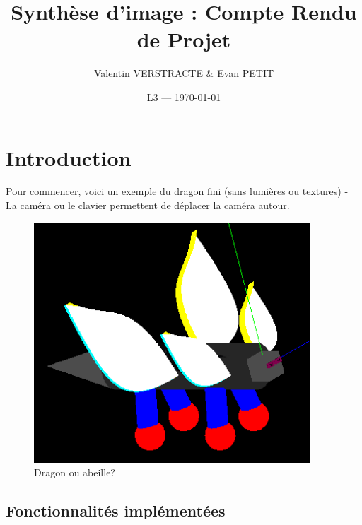 \documentclass{article}
\title{Synthèse d'image : Compte Rendu de Projet} %
\author{Valentin VERSTRACTE \& Evan PETIT}
\date{L3 --- \today} %
\begin{document}
\maketitle %

\bigskip
\bigskip
\renewcommand{\contentsname}{Table des matières}
\tableofcontents
\newpage


\section{Introduction} 

Pour commencer, voici un exemple du dragon fini (sans lumières ou textures) - La caméra ou le clavier permettent de déplacer la caméra autour.
\bigskip

\begin{figure}[!htb]
	\centering
    	\includegraphics[height=9cm]{./assets/dragon_abeille.png}
    	\caption{Dragon ou abeille?}
    	\label{fig:dragon_abeille}
\end{figure}

\subsection{Fonctionnalités implémentées}
\end{document}
